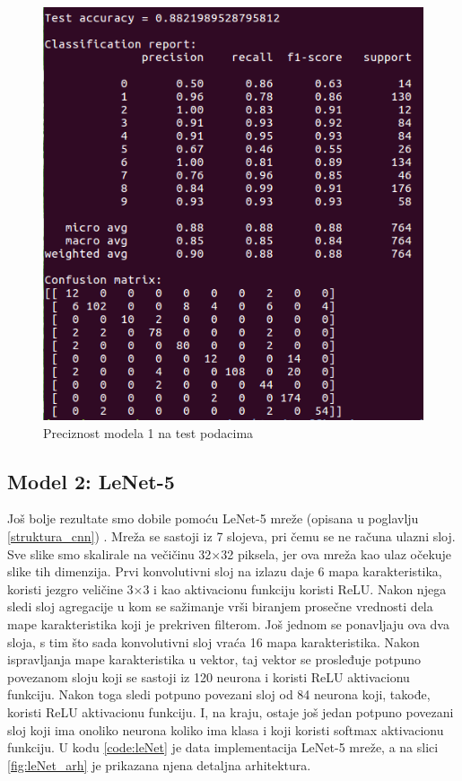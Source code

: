 \documentclass[a4paper]{article}
\begin{document}
\begin{figure}[h!]
\begin{center}
\includegraphics[scale=0.40]{model1_test_acc.png}
\end{center}
\caption{Preciznost modela 1 na test podacima}
\label{fig:model1_test_acc}
\end{figure}




\subsection{Model 2: LeNet-5}
\label{sec:model_2}


Još bolje rezultate smo dobile pomoću LeNet-5 mreže (opisana u poglavlju \ref{struktura_cnn}) \cite{leNet}. Mreža se sastoji iz 7 slojeva, pri čemu se ne računa ulazni sloj. Sve slike smo skalirale na večičinu 32$\times$32 piksela, jer ova mreža kao ulaz očekuje slike tih dimenzija. Prvi konvolutivni sloj na izlazu daje 6 mapa karakteristika, koristi jezgro veličine 3$\times$3 i kao aktivacionu funkciju koristi ReLU. Nakon njega sledi sloj agregacije u kom se sažimanje vrši biranjem prosečne vrednosti dela mape karakteristika koji je prekriven filterom. 
Još jednom se ponavljaju ova dva sloja, s tim što sada konvolutivni sloj vraća 16 mapa karakteristika. Nakon ispravljanja mape karakteristika u vektor, taj vektor se prosleđuje potpuno povezanom sloju koji se sastoji iz 120 neurona i koristi ReLU aktivacionu funkciju. Nakon toga sledi potpuno povezani sloj od 84 neurona koji, takođe, koristi ReLU aktivacionu funkciju. I, na kraju, ostaje još jedan potpuno povezani sloj koji ima onoliko neurona koliko ima klasa i koji koristi softmax aktivacionu funkciju. U kodu \ref{code:leNet} je data implementacija LeNet-5 mreže, a na slici \ref{fig:leNet_arh} je prikazana njena detaljna arhitektura.
\end{document}
